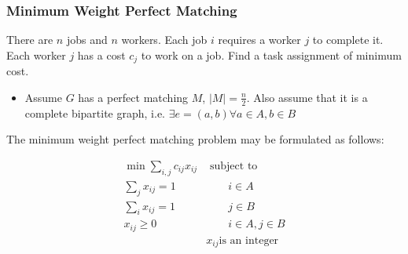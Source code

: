 \documentclass[../notes.tex]{subfiles}
\begin{document}
\subsubsection{Minimum Weight Perfect Matching}

\begin{blockquote}
    There are $ n $ jobs and $ n $ workers. Each job $ i $ requires a worker $ j $ to complete it. Each worker $ j $ has a cost $ c_j $ to work on a job. Find a task assignment of minimum cost.
\end{blockquote}

\begin{itemize}
    \item Assume $ G $ has a perfect matching $ M $, $ |M| = \frac{n}{2} $. Also assume that it is a complete bipartite graph, i.e. $ \exists e=(a,b) \forall a \in A, b \in B $
\end{itemize}


The minimum weight perfect matching problem may be formulated as follows:

\begin{equation}
    \begin{split}
        \min \sum_{i, j} c_{ij} x_{ij} & \text{ subject to}  \\
         \sum_j x_{ij} = 1 &\qquad i \in A  \\
         \sum_i x_{ij} = 1 &\qquad j \in B  \\
         x_{ij} \ge  0 &\qquad i \in A, j \in B \\
                       & x_{ij} \text{is an integer}
    \end{split}
\end{equation}

\end{document}
